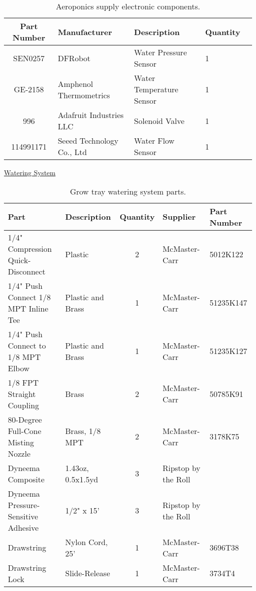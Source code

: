 \begin{table}[!ht]
    \centering
    \begin{tabular}{|c|l|l|l|c|}
    \hline
        Part Number & Manufacturer                  & Description               & Quantity  \\ \hline
        SEN0257     & DFRobot                       & Water Pressure Sensor     & 1         \\ \hline
        GE-2158     & Amphenol Thermometrics        & Water Temperature Sensor  & 1         \\ \hline
        996         & Adafruit Industries LLC       & Solenoid Valve            & 1         \\ \hline
        114991171   & Seeed Technology Co., Ltd     & Water Flow Sensor         & 1         \\ \hline
    \end{tabular}
    \caption{Aeroponics supply electronic components.}
    \label{tab:aeroponics_supply_components}
\end{table}

\clearpage

\uline{Watering System}
\begin{table}[!ht]
    \centering
    \begin{tabular}{|l|l|c|l|l|}
    \hline
        Part                                    & Description           & Quantity  & Supplier              & Part Number   \\ \hline
        1/4" Compression Quick-Disconnect       & Plastic               & 2         & McMaster-Carr         & 5012K122      \\ \hline
        1/4" Push Connect 1/8 MPT Inline Tee    & Plastic and Brass     & 1         & McMaster-Carr         & 51235K147     \\ \hline
        1/4" Push Connect to 1/8 MPT Elbow      & Plastic and Brass     & 1         & McMaster-Carr         & 51235K127     \\ \hline
        1/8 FPT Straight Coupling               & Brass                 & 2         & McMaster-Carr         & 50785K91      \\ \hline
        80-Degree Full-Cone Misting Nozzle      & Brass, 1/8 MPT        & 2         & McMaster-Carr         & 3178K75       \\ \hline
        Dyneema Composite                       & 1.43oz, 0.5x1.5yd     & 3         & Ripstop by the Roll   & ~             \\ \hline
        Dyneema Pressure-Sensitive Adhesive     & 1/2" x 15'            & 3         & Ripstop by the Roll   & ~             \\ \hline
        Drawstring                              & Nylon Cord, 25'       & 1         & McMaster-Carr         & 3696T38       \\ \hline
        Drawstring Lock                         & Slide-Release         & 1         & McMaster-Carr         & 3734T4        \\ \hline
    \end{tabular}
    \caption{Grow tray watering system parts.}
    \label{tab:aeroponics_watering_parts}
\end{table}

